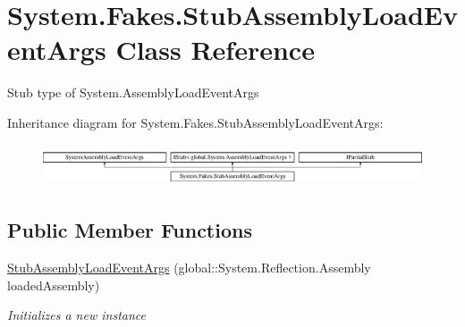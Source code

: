 \hypertarget{class_system_1_1_fakes_1_1_stub_assembly_load_event_args}{\section{System.\-Fakes.\-Stub\-Assembly\-Load\-Event\-Args Class Reference}
\label{class_system_1_1_fakes_1_1_stub_assembly_load_event_args}
}


Stub type of System.\-Assembly\-Load\-Event\-Args 


Inheritance diagram for System.\-Fakes.\-Stub\-Assembly\-Load\-Event\-Args\-:\begin{figure}[H]
\begin{center}
\leavevmode
\includegraphics[height=1.265537cm]{class_system_1_1_fakes_1_1_stub_assembly_load_event_args}
\end{center}
\end{figure}
\subsection*{Public Member Functions}
\begin{DoxyCompactItemize}
\item 
\hyperlink{class_system_1_1_fakes_1_1_stub_assembly_load_event_args_ad7594aaa160d41912ee08cc6d8295d80}{Stub\-Assembly\-Load\-Event\-Args} (global\-::\-System.\-Reflection.\-Assembly loaded\-Assembly)
\begin{DoxyCompactList}\small\item\em Initializes a new instance\end{DoxyCompactList}\end{DoxyCompactItemize}
